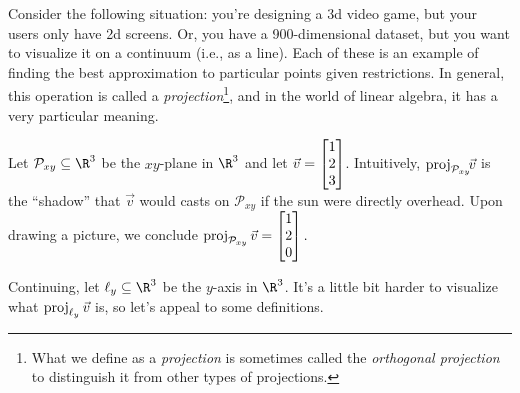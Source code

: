 Consider the following situation: you're designing a 3d video game, but your users only have 2d screens.
Or, you have a 900-dimensional dataset, but you want to visualize it on a continuum (i.e., as a line). 
Each of these is an example
of finding the best approximation to particular points given restrictions. In general, this operation
is called a \emph{projection}\footnote{ What we define as a \emph{projection} is sometimes
called the \emph{orthogonal projection} to distinguish it from other types of projections.}, 
and in the world of linear algebra, it has a very particular meaning.


Let $\mathcal P_{xy}\subseteq\R^3$ be the $xy$-plane in $\R^3$ and let $\vec v=\mat{1\\2\\3}$. Intuitively, 
$\operatorname{proj}_{\mathcal P_{xy}}\!\!\vec v$ is the ``shadow'' that  $\vec v$ would casts on ${\mathcal P_{xy}}$ if 
the sun were directly overhead.
Upon drawing a picture, we conclude $
	\Proj_{\mathcal P_{xy}}\vec v=\mat{1\\2\\0}.
$

\begin{center}
\end{center}

Continuing, let $\ell_y\subseteq \R^3$ be the $y$-axis in $\R^3$. It's a little bit harder to visualize what $\operatorname{proj}_{\ell_y}\vec v$
is, so let's appeal to some definitions.

